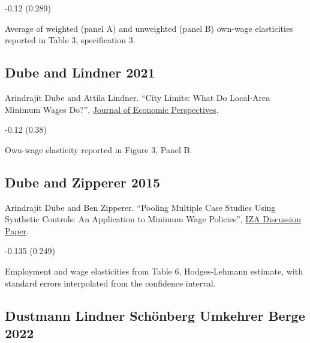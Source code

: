 \vspace{0.7em}

 -0.12 (0.289)

\vspace{0.7em}

 Average of weighted (panel A) and unweighted (panel B) own-wage elasticities reported in Table 3, specification 3.

\subsection*{Dube and Lindner 2021}
\vspace{-0.7em}

\noindent Arindrajit Dube and Attila Lindner. ``City Limits: What Do Local-Area Minimum Wages Do?'', \href{https://doi.org/10.1257/jep.35.1.27}{Journal of Economic Perspectives}.

\vspace{0.7em}

 -0.12 (0.38)

\vspace{0.7em}

 Own-wage elasticity reported in Figure 3, Panel B.

\subsection*{Dube and Zipperer 2015}
\vspace{-0.7em}

\noindent Arindrajit Dube and Ben Zipperer. ``Pooling Multiple Case Studies Using Synthetic Controls: An Application to Minimum Wage Policies'', \href{https://docs.iza.org/dp8944.pdf}{IZA Discussion Paper}.

\vspace{0.7em}

 -0.135 (0.249)

\vspace{0.7em}

 Employment and wage elasticities from Table 6, Hodges-Lehmann estimate, with standard errors interpolated from the confidence interval.

\subsection*{Dustmann Lindner Schönberg Umkehrer Berge 2022}
\vspace{-0.7em}

